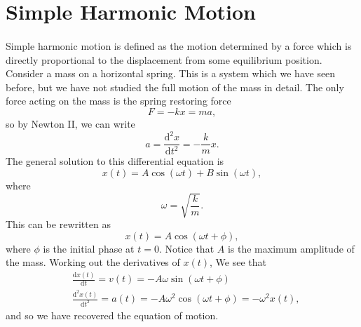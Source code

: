 \documentclass[../newtonian_mechanics.tex]{subfiles}
\begin{document}
    \section{Simple Harmonic Motion}
        \paragraph{}
        Simple harmonic motion is defined as the motion determined by a force which is directly proportional to the displacement from some equilibrium position.
        Consider a mass on a horizontal spring. This is a system which we have seen before, but we have not studied the full motion of the mass in detail.
        The only force acting on the mass is the spring restoring force
        \begin{equation}
            F = -kx = ma,
        \end{equation}
        so by Newton II, we can write
        \begin{equation}\label{eq-SHM-spring}
            a = \frac{\mathrm{d}^2x}{\mathrm{d}t^2}=-\frac{k}{m}x.
        \end{equation}
        The general solution to this differential equation is
        \begin{equation}
            x(t)=A\cos(\omega t) + B\sin(\omega t),
        \end{equation}
        where
        \begin{equation}
            \omega=\sqrt{\frac{k}{m}}.
        \end{equation}
        This can be rewritten as
        \begin{equation}
            x(t) = A\cos(\omega t + \phi),
        \end{equation}
        where $\phi$ is the initial phase at $t=0$.
        Notice that $A$ is the maximum amplitude of the mass. 
        Working out the derivatives of $x(t)$, We see that
        \begin{align}
            &\frac{\mathrm{d}x(t)}{\mathrm{d}t} = v(t) = -A\omega\sin(\omega t + \phi)\\
            &\frac{\mathrm{d}^2x(t)}{\mathrm{d}t^2} = a(t) = -A\omega^2\cos(\omega t + \phi) = -\omega^2x(t),
        \end{align}
        and so we have recovered the equation of motion.
\end{document}
